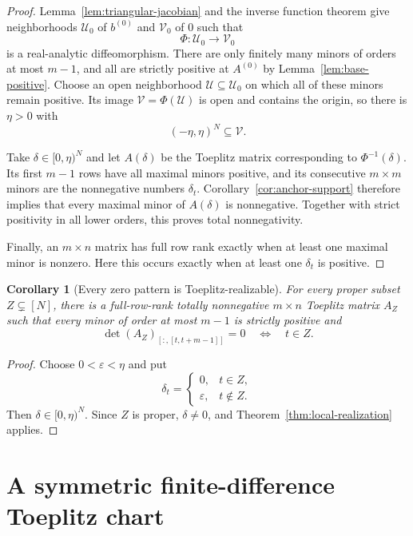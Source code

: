 \documentclass{amsart}
\numberwithin{equation}{section}
\newtheorem{corollary}[theorem]{Corollary}
\theoremstyle{definition}
\theoremstyle{remark}
\begin{document}
\begin{proof}
Lemma~\ref{lem:triangular-jacobian} and the inverse function theorem give neighborhoods $\mathcal U_0$ of $b^{(0)}$ and $\mathcal V_0$ of $0$ such that
\[
 \Phi:\mathcal U_0\longrightarrow\mathcal V_0
\]
is a real-analytic diffeomorphism.  There are only finitely many minors of orders at most $m-1$, and all are strictly positive at $A^{(0)}$ by Lemma~\ref{lem:base-positive}.  Choose an open neighborhood $\mathcal U\subseteq\mathcal U_0$ on which all of these minors remain positive.  Its image $\mathcal V=\Phi(\mathcal U)$ is open and contains the origin, so there is $\eta>0$ with
\[
 (-\eta,\eta)^N\subseteq\mathcal V.
\]

Take $\delta\in[0,\eta)^N$ and let $A(\delta)$ be the Toeplitz matrix corresponding to $\Phi^{-1}(\delta)$.  Its first $m-1$ rows have all maximal minors positive, and its consecutive $m\times m$ minors are the nonnegative numbers $\delta_t$.  Corollary~\ref{cor:anchor-support} therefore implies that every maximal minor of $A(\delta)$ is nonnegative.  Together with strict positivity in all lower orders, this proves total nonnegativity.

Finally, an $m\times n$ matrix has full row rank exactly when at least one maximal minor is nonzero.  Here this occurs exactly when at least one $\delta_t$ is positive.
\end{proof}

\begin{corollary}[Every zero pattern is Toeplitz-realizable]\label{cor:every-Z}
For every proper subset $Z\subsetneq[N]$, there is a full-row-rank totally nonnegative $m\times n$ Toeplitz matrix $A_Z$ such that every minor of order at most $m-1$ is strictly positive and
\begin{equation}\label{eq:exact-Z}
 \det (A_Z)_{[:,[t,t+m-1]]}=0
 \quad\Longleftrightarrow\quad
 t\in Z.
\end{equation}
\end{corollary}

\begin{proof}
Choose $0<\varepsilon<\eta$ and put
\[
 \delta_t=
 \begin{cases}
  0,&t\in Z,\\
  \varepsilon,&t\notin Z.
 \end{cases}
\]
Then $\delta\in[0,\eta)^N$.  Since $Z$ is proper, $\delta\ne0$, and Theorem~\ref{thm:local-realization} applies.
\end{proof}


\section{A symmetric finite-difference Toeplitz chart}\label{sec:polynomial-chart}
\end{document}
